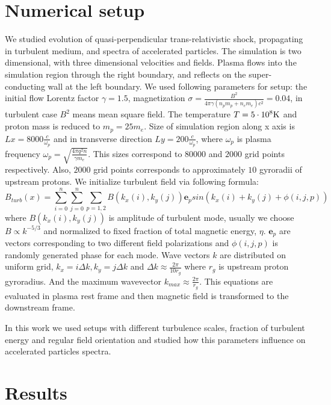 \documentclass[a4paper]{jpconf}
\begin{document}
\section{Numerical setup}
We studied evolution of quasi-perpendicular trans-relativistic shock, propagating in turbulent medium, and spectra of accelerated particles. The simulation is two dimensional, with three dimensional velocities and fields. Plasma flows into the simulation region through the right boundary, and reflects on the super-conducting wall at the left boundary. We used following parameters for setup: the initial flow Lorentz factor $\gamma = 1.5$, magnetization $\sigma = \frac{B^2}{4\pi\gamma (n_p m_p + n_e m_e) c^2} = 0.04$, in turbulent case $B^2$ means mean square field. The temperature $T = 5\cdot10^8 \rm{K}$ and proton mass is reduced to $m_p = 25 m_e$. Size of simulation region along x axis is $Lx = 8000\frac{c}{\omega_p}$ and in transverse direction $Ly = 200\frac{c}{\omega_p}$, where $\omega_p$ is plasma frequency $\omega_p = \sqrt{\frac{4\pi q^2 n}{\gamma m_e}}$. This sizes correspond to $80000$ and $2000$ grid points respectively. Also, $2000$ grid points corresponds to approximately $10$ gyroradii of upstream protons.
We initialize turbulent field via following formula: 
\begin{equation}
B_{turb} (x) = \sum_{i=0}^{n}\sum_{j=0}^{n}\sum_{p=1,2}B(k_x(i),k_y(j)) \textbf{e}_{p} sin(k_x(i) + k_y(j) + \phi (i,j,p))
\end{equation}
where $B(k_x(i),k_y(j))$ is amplitude of turbulent mode, usually we choose $B \propto k^{-5/3}$ and normalized to fixed fraction of total magnetic energy, $\eta$. $\textbf{e}_{p}$ are vectors corresponding to two different field polarizations and $\phi (i,j,p)$ is randomly generated phase for each mode. Wave vectors $k$ are distributed on uniform grid, $k_x = i \Delta k, k_y = j \Delta k$ and $\Delta k \approx \frac{2 \pi}{10 r_g}$ where $r_g$ is upstream proton gyroradius. And the maximum wavevector $k_{max} \approx \frac{2 \pi}{r_g}$. This equations are evaluated in plasma rest frame and then magnetic field is transformed to the downstream frame.

In this work we used setups with different turbulence scales, fraction of turbulent energy and regular field orientation and studied how this parameters influence on accelerated particles spectra.
\section{Results}
\end{document}
